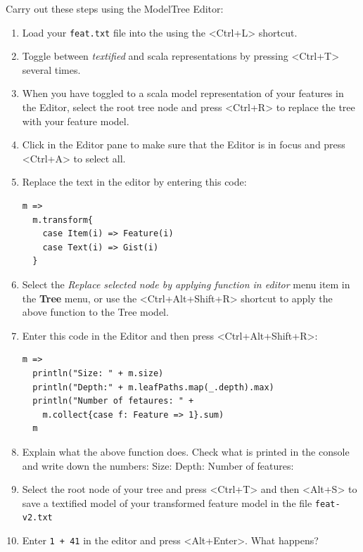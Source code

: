 \documentclass[11pt]{article}
\begin{document}
\begin{framed}
\noindent Carry out these steps using the ModelTree Editor:
\begin{enumerate}
\item Load your \verb+feat.txt+ file into the using the <Ctrl+L> shortcut.
\item Toggle between {\it textified} and scala representations by pressing <Ctrl+T> several times.
\item When you have toggled to a scala model representation of your features in the Editor, select the root tree node and press <Ctrl+R> to replace the tree with your feature model.
\item Click in the Editor pane to make sure that the Editor is in focus and press <Ctrl+A> to select all.
\item Replace the text in the editor by entering this code: {\scriptsize\begin{verbatim}
m =>
  m.transform{
    case Item(i) => Feature(i)
    case Text(i) => Gist(i)
  }
\end{verbatim}}



\item Select the {\it Replace selected node by applying function in editor} menu item in the {\bf Tree} menu, or use the <Ctrl+Alt+Shift+R> shortcut to apply the above function to the Tree model.


\item Enter this code in the Editor and then press <Ctrl+Alt+Shift+R>: {\scriptsize\begin{verbatim}
m =>
  println("Size: " + m.size)
  println("Depth:" + m.leafPaths.map(_.depth).max)
  println("Number of fetaures: " + 
    m.collect{case f: Feature => 1}.sum)
  m
\end{verbatim}}



\item Explain what the above function does. Check what is printed in the console and write down the numbers: 
\newline Size: \underline{\hspace{1cm}} Depth: \underline{\hspace{1cm}}  Number of features: \underline{\hspace{1cm}}

\item Select the root node of your tree and press <Ctrl+T> and then <Alt+S> to save a textified model of your transformed feature model in the file \verb+feat-v2.txt+


\item Enter \verb?1 + 41? in the editor and press <Alt+Enter>. What happens?
\end{enumerate}
\end{framed}
\end{document}
